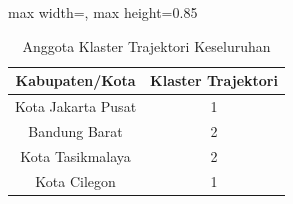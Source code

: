 \begin{table}[H]
\centering
\caption{Anggota Klaster Trajektori Keseluruhan} \label{tab:clustermembers}
\begin{adjustbox}{max width=\textwidth, max height=0.85\textheight}
\begin{tabular}{|c|c|}
\hline
\textbf{Kabupaten/Kota} & \textbf{Klaster Trajektori} \\
\hline
Kota Jakarta Pusat & 1 \\
Bandung Barat & 2 \\
Kota Tasikmalaya & 2 \\
Kota Cilegon & 1 \\
\hline
\end{tabular}
\end{adjustbox}
\end{table}